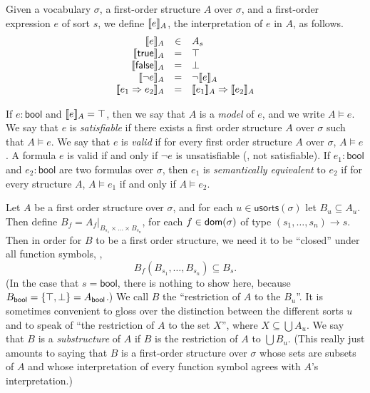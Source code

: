 Given a vocabulary $\sigma$,
  a first-order structure $A$ over $\sigma$,
  and a first-order expression $e$ of sort $s$,
  we define $\llbracket{e}\rrbracket_A$,
  the interpretation of $e$ in $A$, as follows.
\begin{gather*}
  \begin{array}{rcl}
  \llbracket{e}\rrbracket_A &\in& A_s\\
  \llbracket{\mathsf{true}}\rrbracket_A &=& \top\\
  \llbracket{\mathsf{false}}\rrbracket_A &=& \bot\\
  \llbracket{\lnot e}\rrbracket_A &=& \lnot \llbracket{e}\rrbracket_A\\
  \llbracket{e_1 \Rightarrow e_2}\rrbracket_A &=& \llbracket{e_1}\rrbracket_A \Rightarrow \llbracket{e_2}\rrbracket_A\\
  \end{array}
\end{gather*}

If $e : \mathsf{bool}$ and $\llbracket{e}\rrbracket_A = \top$,
  then we say that $A$ is a \emph{model} of $e$,
  and we write $A \models e$.
We say that $e$ is \emph{satisfiable} if there exists a first order structure $A$ over $\sigma$ such that $A\models e$.
We say that $e$ is \emph{valid} if for every first order structure $A$ over $\sigma$, $A\models e$.
A formula $e$ is valid if and only if $\neg e$ is unsatisfiable (\ie, not satisfiable).
%
If $e_1 : \mathsf{bool}$ and $e_2 : \mathsf{bool}$ are two formulas over $\sigma$,
then $e_1$  is \emph{semantically equivalent} to $e_2$ if for every structure $A$,
$A\models e_1$ if and only if $A\models e_2$.

Let $A$ be a first order structure over $\sigma$,
and for each $u\in\mathsf{usorts}(\sigma)$ let $B_u\subseteq A_u$.
Then define $B_f = A_f|_{B_{s_1}\times\dots\times B_{s_{n}}}$,
for each $f \in \mathsf{dom}(\sigma)$ of type $(s_1, \dots, s_n)\to s$.
Then in order for $B$ to be a first order structure,
we need it to be ``closed'' under all function symbols, \ie,
\[
  B_f(B_{s_1}, \dots, B_{s_n}) \subseteq B_s.
\]
(In the case that $s = \mathsf{bool}$, there is nothing to show here,
because $B_{\mathsf{bool}} = \left\{{\top, \bot}\right\} = A_{\mathsf{bool}}$.)
We call $B$ the ``restriction of $A$ to the $B_u$''.
It is sometimes convenient to gloss over the distinction between the different sorts $u$
and to speak of ``the restriction of $A$ to the set $X$'', where $X \subseteq \bigcup A_u$.
We say that $B$ is a \emph{substructure} of $A$ if $B$ is the restriction of $A$ to $\bigcup B_u$.
(This really just amounts to saying that $B$ is a first-order structure over $\sigma$
whose sets are subsets of $A$
and whose interpretation of every function symbol agrees with $A$'s interpretation.)

